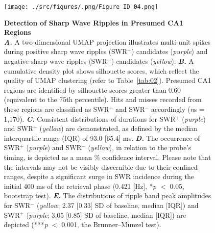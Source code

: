 \documentclass[final,3p,times,twocolumn]{elsarticle}
\begin{document}
        \begin{figure}[ht]
        	\centering
            \texttt{[image: ./src/figures/.png/Figure\_ID\_04.png]}
        	\caption{\textbf{Detection of Sharp Wave Ripples in Presumed CA1 Regions}\\
\textbf{\textit{A.}} A two-dimensional UMAP \cite{mcinnes_umap_2018} projection illustrates multi-unit spikes during positive sharp wave ripples (SWR$^+$) candidates (\textit{purple}) and negative sharp wave ripples (SWR$^-$) candidates (\textit{yellow}). \textbf{\textit{B.}} A cumulative density plot shows silhouette scores, which reflect the quality of UMAP clustering (refer to Table~\ref{tab:02}). Presumed CA1 regions are identified by silhouette scores greater than 0.60 (equivalent to the 75th percentile). Hits and misses recorded from these regions are classified as SWR$^+$ and SWR$^-$ accordingly (\textit{n}s = 1,170). \textbf{\textit{C.}} Consistent distributions of durations for SWR$^+$ (\textit{purple}) and SWR$^-$ (\textit{yellow}) are demonstrated, as defined by the median interquartile range (IQR) of 93.0 [65.4] ms. \textbf{\textit{D.}} The occurrence of SWR$^+$ (\textit{purple}) and SWR$^-$ (\textit{yellow}), in relation to the probe's timing, is depicted as a mean \% confidence interval. Please note that the intervals may not be visibly discernible due to their confined ranges, despite a significant surge in SWR incidence during the initial 400 ms of the retrieval phase (0.421 [Hz], *\textit{p} $<$ 0.05, bootstrap test). \textbf{\textit{E.}} The distributions of ripple band peak amplitudes for SWR$^-$ (\textit{yellow}; 2.37 [0.33] SD of baseline, median [IQR]) and SWR$^+$ (\textit{purple}; 3.05 [0.85] SD of baseline, median [IQR]) are depicted (***\textit{p} $<$ 0.001, the Brunner--Munzel test).} %
        	\label{fig:04}
        \end{figure}
        \clearpage
\end{document}
